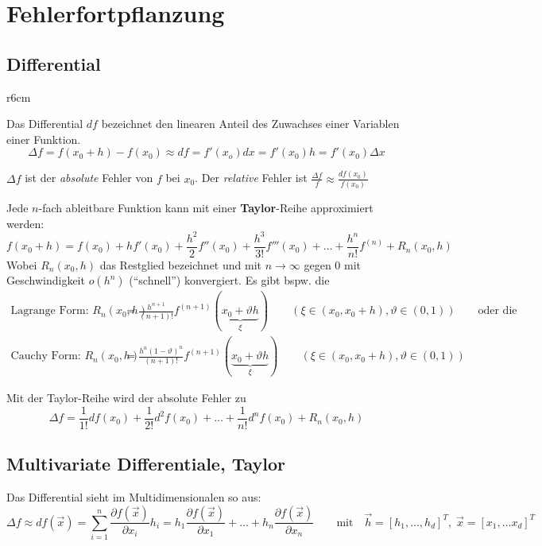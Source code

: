 \section{Fehlerfortpflanzung}

\subsection{Differential}
  \begin{wrapfigure}{r}{6cm}
      
  \end{wrapfigure}
  
  Das Differential $df$ bezeichnet den linearen Anteil des Zuwachses einer Variablen einer Funktion.
  \[
      \Delta f = f(x_0+h)-f(x_0) \approx df = f'(x_o) dx = f'(x_0) h = f'(x_0) \Delta x
  \]
  
  $\Delta f$ ist der \emph{absolute} Fehler von $f$ bei $x_0$.
  Der \emph{relative} Fehler ist $\frac{\Delta f}{f} \approx \frac{df(x_0)}{f(x_0)}$
  
  Jede $n$-fach ableitbare Funktion kann mit einer \textbf{Taylor}-Reihe approximiert werden:
  $$f(x_0+h) = f(x_0) + h f'(x_0) + \frac{h^2}{2} f''(x_0) + \frac{h^3}{3!} f'''(x_0) + 
  \ldots + \frac{h^n}{n!} f^{(n)} + R_n(x_0,h)$$
  Wobei $R_n(x_0,h)$ das Restglied bezeichnet und mit $n \rightarrow \infty$ gegen $0$ mit 
  Geschwindigkeit $o(h^n)$ ("`schnell"') konvergiert. Es gibt bspw. die 
  \begin{align*}
    \text{Lagrange Form: } R_n(x_0,h) &= \frac{h^{n+1}}{(n+1)!} f^{(n+1)}(\underbrace{x_0 + \vartheta h}_{\xi})
    \qquad (\xi \in (x_0, x_0+h), \vartheta \in (0,1)) \qquad \text{oder die }\\
    \text{Cauchy Form: } R_n(x_0,h) &= \frac{h^n(1-\vartheta)^n}{(n+1)!} f^{(n+1)}(\underbrace{x_0 + \vartheta h}_{\xi})
    \qquad (\xi \in (x_0, x_0+h), \vartheta \in (0,1))
  \end{align*}
  
  Mit der Taylor-Reihe wird der absolute Fehler zu
  \[
      \Delta f = \frac{1}{1!}df(x_0) + \frac{1}{2!}d^2f(x_0) + \ldots + \frac{1}{n!}d^n f(x_0) + R_n(x_0,h)
  \]
  
   
\subsection{Multivariate Differentiale, Taylor}
  Das Differential sieht im Multidimensionalen so aus:
  \[
      \Delta f \approx df(\vec{x}) = \sum\limits_{i=1}^n \frac{\partial f(\vec{x})}{\partial x_i} h_i = h_1 \frac{\partial f(\vec{x})}{\partial x_1} + \ldots + 
      h_n \frac{\partial f(\vec{x})}{\partial x_n} \qquad \text{mit} \quad \vec{h} = [h_1, \ldots, h_d]^T, \; \vec{x} = [x_1, \ldots x_d]^T
  \]

